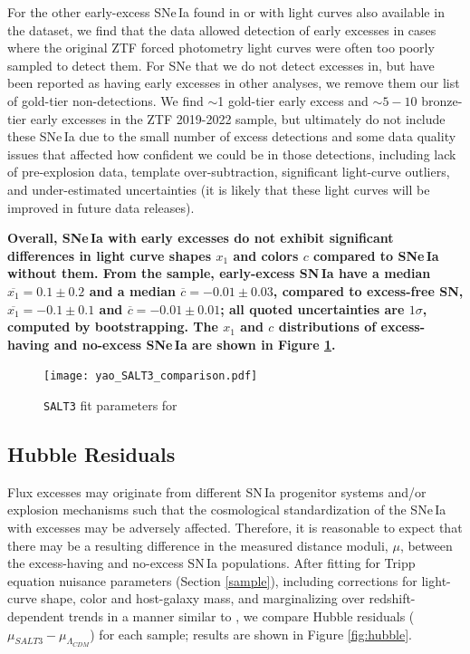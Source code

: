 \documentclass[twocolumn,twocolappendix, linenumbers]{aastex631} %
\begin{document}
For the other early-excess SNe\,Ia found in \cite{Burke22b} or \cite{Yao19} with light curves also available in the \citet{Dhawan22} dataset, we find that the \citet{Dhawan22} data allowed detection of early excesses in cases where the original ZTF forced photometry light curves were often too poorly sampled to detect them. For SNe that we do not detect excesses in, but have been reported as having early excesses in other analyses, we remove them our list of gold-tier non-detections. We find $\sim$1 gold-tier early excess and $\sim 5-10$ bronze-tier early excesses in the ZTF 2019-2022 sample, but ultimately do not include these SNe\,Ia due to the small number of excess detections and some data quality issues that affected how confident we could be in those detections, including lack of pre-explosion data, template over-subtraction, significant light-curve outliers, and under-estimated uncertainties (it is likely that these light curves will be improved in future data releases).

 {\bf Overall, SNe\,Ia with early excesses do not exhibit significant differences in light curve shapes $x_1$ and colors $c$ compared to SNe\,Ia without them. From the \citet{Yao19} sample, early-excess SN\,Ia have a median $\overline{x_1} = 0.1 \pm 0.2$  and a median $\overline{c} = -0.01 \pm 0.03$, compared to excess-free SN, $\overline{x_1} = -0.1 \pm 0.1$ and $\overline{c} = -0.01 \pm 0.01$; all quoted uncertainties are $1\sigma$, computed by bootstrapping.  The $x_1$ and $c$ distributions of excess-having and no-excess SNe\,Ia are shown in Figure \ref{fig:salt3params}.} 

\begin{figure}
    \centering
    \texttt{[image: yao\_SALT3\_comparison.pdf]}
    \caption{\texttt{SALT3} fit parameters for \cite{Yao19}}
    \label{fig:salt3params}
\end{figure}

\subsection{Hubble Residuals}
\label{sec:hubbleres}

Flux excesses may originate from different SN\,Ia progenitor systems and/or explosion mechanisms such that the cosmological standardization of the SNe\,Ia with excesses may be adversely affected.
Therefore, it is reasonable to expect that there may be a resulting difference in the measured distance moduli, $\mu$, between the excess-having and no-excess SN\,Ia populations. After fitting for Tripp equation nuisance parameters (Section \ref{sample}), including corrections for 
light-curve shape, color and host-galaxy mass, and marginalizing over redshift-dependent trends in a manner similar to \citet{Marriner11}, we compare Hubble residuals ($\mu_{SALT3} - \mu_{\Lambda_{CDM}}$) for each sample; results are shown in Figure \ref{fig:hubble}.
\end{document}
